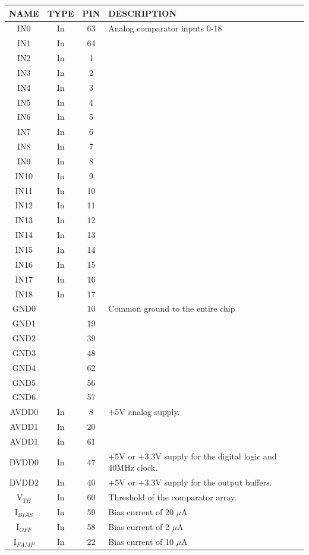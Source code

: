 \documentclass[letterpaper]{article}
\begin{document}
\begin{center}
\begin{tabular}{ | c | c | c | l | }
\hline
\textbf{NAME} & \textbf{TYPE} & \textbf{PIN} & \textbf{DESCRIPTION} \\
\hline
IN0 & In & 63 & Analog comparator inputs 0-18 \\
IN1 & In & 64 &  \\
IN2 & In & 1 &  \\
IN3 & In & 2 &  \\
IN4 & In & 3 &  \\
IN5 & In & 4 &  \\
IN6 & In & 5 &  \\
IN7 & In & 6 &  \\
IN8 & In & 7 &  \\
IN9 & In & 8 &  \\
IN10 & In & 9 &  \\
IN11 & In & 10 &  \\
IN12 & In & 11 &  \\
IN13 & In & 12 &  \\
IN14 & In & 13 &  \\
IN15 & In & 14 &  \\
IN16 & In & 15 &  \\
IN17 & In & 16 &  \\
IN18 & In & 17 &  \\
\hline
GND0 &  & 10 & Common ground to the entire chip \\
GND1 &  & 19 &  \\
GND2 &  & 39 &  \\
GND3 &  & 48 &  \\
GND4 &  & 62 &  \\
GND5 &  & 56 &  \\
GND6 &  & 57 &  \\
\hline
AVDD0 & In & 8 & +5V analog supply. \\
AVDD1 & In & 20 &  \\
AVDD1 & In & 61 &  \\
\hline
DVDD0 & In & 47 & +5V or +3.3V supply for the digital logic and 40MHz clock. \\
\hline
DVDD2 & In & 40 & +5V or +3.3V supply for the output buffers. \\
\hline
V$_{TH}$ & In & 60 & Threshold of the comparator array. \\
\hline
I$_{BIAS}$ & In & 59 & Bias current of 20 $\mu$A \\
I$_{OFF}$ & In & 58 & Bias current of 2 $\mu$A \\
I$_{FAMP}$ & In & 22 & Bias current of 10 $\mu$A \\

\end{tabular}
\end{center}
\end{document}
